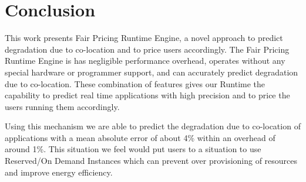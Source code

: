 \documentclass[pageno]{jpaper}
\begin{document}
\section{Conclusion}
\label{sec:Conclusion}

\vspace{-2 mm}This work presents Fair Pricing Runtime Engine, a novel approach to predict degradation due to co-location and to price users accordingly. The Fair Pricing Runtime Engine is has negligible performance overhead, operates without any special hardware or programmer support, and can accurately predict degradation due to co-location. These combination of features gives our Runtime the capability to predict real time applications with high precision and to price the users running them accordingly.

Using this mechanism we are able to predict the degradation due to co-location of applications with a mean absolute error of about 4\% within an overhead of around 1\%. This situation we feel would put users to a situation to use Reserved/On Demand Instances which can prevent over provisioning of resources and improve energy efficiency.


\balance

\end{document}
